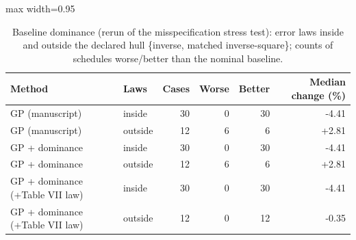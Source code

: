 \begin{table}[t]
\centering
\caption{Baseline dominance (rerun of the misspecification stress test): error laws inside and outside the declared hull \{inverse, matched inverse-square\}; counts of schedules worse/better than the nominal baseline.}\label{tab:c4a}
\footnotesize
\begin{adjustbox}{max width=0.95\textwidth}
\begin{tabular}{llrrrr}
\toprule
Method & Laws & Cases & Worse & Better & Median change (\%) \\
\midrule
GP (manuscript) & inside & 30 & 0 & 30 & -4.41 \\
GP (manuscript) & outside & 12 & 6 & 6 & +2.81 \\
GP + dominance & inside & 30 & 0 & 30 & -4.41 \\
GP + dominance & outside & 12 & 6 & 6 & +2.81 \\
GP + dominance (+Table VII law) & inside & 30 & 0 & 30 & -4.41 \\
GP + dominance (+Table VII law) & outside & 12 & 0 & 12 & -0.35 \\
\bottomrule
\end{tabular}
\end{adjustbox}
\end{table}
